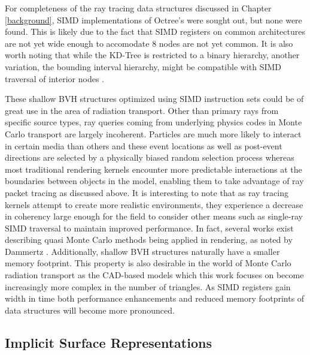 \documentclass[12pt, a4paper]{article}
\begin{document}
For completeness of the ray tracing data structures discussed in Chapter \ref{background}, SIMD implementations of Octree's were sought out, but none were found. This is likely due to the fact that SIMD registers on common architectures are not yet wide enough to accomodate 8 nodes are not yet common. It is also worth noting that while the KD-Tree is restricted to a binary hierarchy, another variation, the bounding interval hierarchy, might be compatible with SIMD traversal of interior nodes \cite{Watcher_2006}. 

These shallow BVH structures optimized using SIMD instruction sets could be of great use in the area of radiation transport. Other than primary rays from specific source types, ray queries coming from underlying physics codes in Monte Carlo transport are largely incoherent. Particles are much more likely to interact in certain media than others and these event locations as well as post-event directions are selected by a physically biased random selection process whereas most traditional rendering kernels encounter more predictable interactions at the boundaries between objects in the model, enabling them to take advantage of ray packet tracing as discussed above. It is interesting to note that as ray tracing kernels attempt to create more realistic environments, they experience a decrease in coherency large enough for the field to consider other means such as single-ray SIMD traversal to maintain improved performance. In fact, several works exist describing quasi Monte Carlo methods being applied in rendering, as noted by Dammertz \cite{Dammertz_2008}. Additionally, shallow BVH structures naturally have a smaller memory footprint. This property is also desirable in the world of Monte Carlo radiation transport as the CAD-based models which this work focuses on become increasingly more complex in the number of triangles. As SIMD registers gain width in time both performance enhancements and reduced memory footprints of data structures will become more pronounced.


\subsection{Implicit Surface Representations}%
\label{implicit_surfaces}
\end{document}
